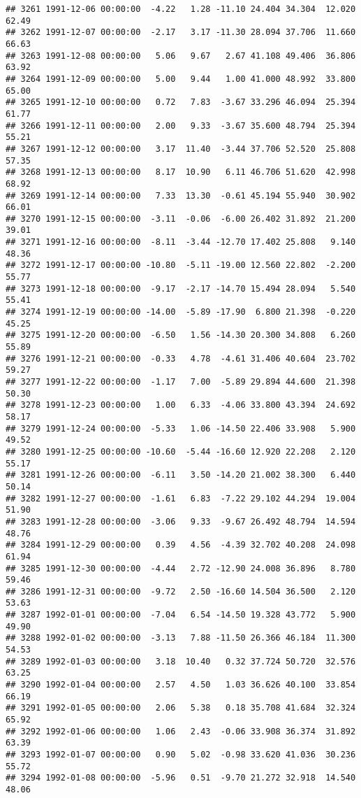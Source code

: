 \documentclass{article}\usepackage{graphicx, color}
\makeatletter
\newenvironment{kframe}{%
 \def\at@end@of@kframe{}%
 \ifinner\ifhmode%
  \def\at@end@of@kframe{\end{minipage}}%
  \begin{minipage}{\columnwidth}%
 \fi\fi%
 \def\FrameCommand##1{\hskip\@totalleftmargin \hskip-\fboxsep
 \colorbox{shadecolor}{##1}\hskip-\fboxsep
     \hskip-\linewidth \hskip-\@totalleftmargin \hskip\columnwidth}%
 \MakeFramed {\advance\hsize-\width
   \@totalleftmargin\z@ \linewidth\hsize
   \@setminipage}}%
 {\par\unskip\endMakeFramed%
 \at@end@of@kframe}
\newenvironment{knitrout}{}{} %
\makeatother
\begin{document}
\begin{knitrout}
\begin{kframe}
\begin{verbatim}
## 3261 1991-12-06 00:00:00  -4.22   1.28 -11.10 24.404 34.304  12.020  62.49
## 3262 1991-12-07 00:00:00  -2.17   3.17 -11.30 28.094 37.706  11.660  66.63
## 3263 1991-12-08 00:00:00   5.06   9.67   2.67 41.108 49.406  36.806  63.92
## 3264 1991-12-09 00:00:00   5.00   9.44   1.00 41.000 48.992  33.800  65.00
## 3265 1991-12-10 00:00:00   0.72   7.83  -3.67 33.296 46.094  25.394  61.77
## 3266 1991-12-11 00:00:00   2.00   9.33  -3.67 35.600 48.794  25.394  55.21
## 3267 1991-12-12 00:00:00   3.17  11.40  -3.44 37.706 52.520  25.808  57.35
## 3268 1991-12-13 00:00:00   8.17  10.90   6.11 46.706 51.620  42.998  68.92
## 3269 1991-12-14 00:00:00   7.33  13.30  -0.61 45.194 55.940  30.902  66.01
## 3270 1991-12-15 00:00:00  -3.11  -0.06  -6.00 26.402 31.892  21.200  39.01
## 3271 1991-12-16 00:00:00  -8.11  -3.44 -12.70 17.402 25.808   9.140  48.36
## 3272 1991-12-17 00:00:00 -10.80  -5.11 -19.00 12.560 22.802  -2.200  55.77
## 3273 1991-12-18 00:00:00  -9.17  -2.17 -14.70 15.494 28.094   5.540  55.41
## 3274 1991-12-19 00:00:00 -14.00  -5.89 -17.90  6.800 21.398  -0.220  45.25
## 3275 1991-12-20 00:00:00  -6.50   1.56 -14.30 20.300 34.808   6.260  55.89
## 3276 1991-12-21 00:00:00  -0.33   4.78  -4.61 31.406 40.604  23.702  59.27
## 3277 1991-12-22 00:00:00  -1.17   7.00  -5.89 29.894 44.600  21.398  50.30
## 3278 1991-12-23 00:00:00   1.00   6.33  -4.06 33.800 43.394  24.692  58.17
## 3279 1991-12-24 00:00:00  -5.33   1.06 -14.50 22.406 33.908   5.900  49.52
## 3280 1991-12-25 00:00:00 -10.60  -5.44 -16.60 12.920 22.208   2.120  55.17
## 3281 1991-12-26 00:00:00  -6.11   3.50 -14.20 21.002 38.300   6.440  50.14
## 3282 1991-12-27 00:00:00  -1.61   6.83  -7.22 29.102 44.294  19.004  51.90
## 3283 1991-12-28 00:00:00  -3.06   9.33  -9.67 26.492 48.794  14.594  48.76
## 3284 1991-12-29 00:00:00   0.39   4.56  -4.39 32.702 40.208  24.098  61.94
## 3285 1991-12-30 00:00:00  -4.44   2.72 -12.90 24.008 36.896   8.780  59.46
## 3286 1991-12-31 00:00:00  -9.72   2.50 -16.60 14.504 36.500   2.120  53.63
## 3287 1992-01-01 00:00:00  -7.04   6.54 -14.50 19.328 43.772   5.900  49.90
## 3288 1992-01-02 00:00:00  -3.13   7.88 -11.50 26.366 46.184  11.300  54.53
## 3289 1992-01-03 00:00:00   3.18  10.40   0.32 37.724 50.720  32.576  63.25
## 3290 1992-01-04 00:00:00   2.57   4.50   1.03 36.626 40.100  33.854  66.19
## 3291 1992-01-05 00:00:00   2.06   5.38   0.18 35.708 41.684  32.324  65.92
## 3292 1992-01-06 00:00:00   1.06   2.43  -0.06 33.908 36.374  31.892  63.39
## 3293 1992-01-07 00:00:00   0.90   5.02  -0.98 33.620 41.036  30.236  55.72
## 3294 1992-01-08 00:00:00  -5.96   0.51  -9.70 21.272 32.918  14.540  48.06

\end{verbatim}
\end{kframe}
\end{knitrout}
\end{document}
